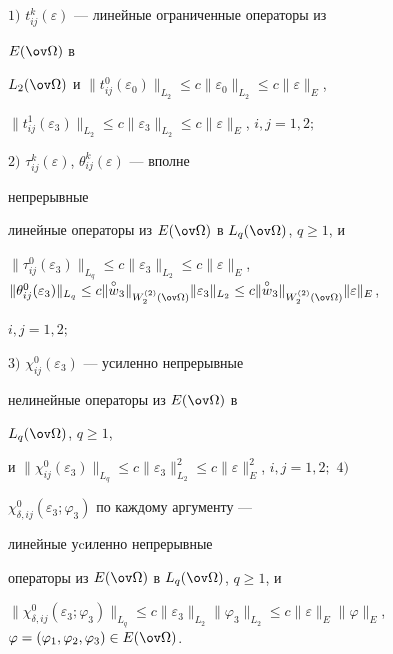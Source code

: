 \begin{lem} 


$1)$ $t^k_{ij}(\varepsilon)$ --- линейные ограниченные операторы из 


$E(\ov\Omega)$ в 


$L_2(\ov\Omega)$ и $\|t^0_{ij}(\varepsilon_0)\|_{L_2}\le 


c\|\varepsilon_0\|_{L_2}\le c\|\varepsilon\|_E$,


$\|t^1_{ij}(\varepsilon_3)\|_{L_2}\le 


c\|\varepsilon_3\|_{L_2}\le c\|\varepsilon\|_E$, $i,j=1,2;$ 


$2)$ $\tau^k_{ij}(\varepsilon)$, $\theta^k_{ij}(\varepsilon)$ --- вполне 


непрерывные 


линейные операторы из $E(\ov\Omega)$ в $L_q(\ov\Omega)$, $q\ge1$, и 


$\|\tau^0_{ij}(\varepsilon_3)\|_{L_q}\le c\|\varepsilon_3\|_{L_2}\le 


c\|\varepsilon\|_E$, $\|\theta^0_{ij}(\varepsilon_3)\|_{L_q}\le 


c\|\up{\circ}{w}_3\|_{W^{(2)}_2(\ov\Omega)} \|\varepsilon_3\|_{L_2}\le 


c\|\up{\circ}{w}_3\|_{W^{(2)}_2(\ov\Omega)} \|\varepsilon\|_E$, 


$i,j=1,2;$ 


$3)$ $\chi^0_{ij}(\varepsilon_3)$ --- усиленно непрерывные 


нелинейные операторы из $E(\ov\Omega)$ в 


$L_q(\ov\Omega)$, $q\ge1$, 


и $\|\chi^0_{ij}(\varepsilon_3)\|_{L_q}\le c\|\varepsilon_3\|^2_{L_2} \le 


c\|\varepsilon\|^2_E$, $i,j=1,2;$ $4)$ 


$\chi^0_{\delta,ij}(\varepsilon_3;\varphi_3)$ по каждому аргументу --- 


линейные уcиленно непрерывные 


операторы из $E(\ov\Omega)$ в $L_q(\ov\Omega)$, $q\ge1$, и 


$\|\chi^0_{\delta,ij}(\varepsilon_3;\varphi_3)\|_{L_q}\le 


c\|\varepsilon_3\|_{L_2} \|\varphi_3\|_{L_2}\le c\|\varepsilon\|_E 


\|\varphi\|_E$, $\varphi=(\varphi_1,\varphi_2,\varphi_3)\in 


E(\ov\Omega)$. 


\end{lem} 





